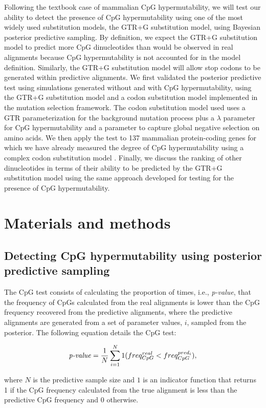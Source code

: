 \documentclass{article}
\begin{document}
Following the textbook case of mammalian CpG hypermutability, we will test our ability to detect the presence of CpG hypermutability using one of the most widely used substitution models, the GTR+G substitution model, using Bayesian posterior predictive sampling.  By definition, we expect the GTR+G substitution model to predict more CpG dinucleotides than would be observed in real alignments because CpG hypermutability is not accounted for in the model definition.  Similarly, the GTR+G substitution model will allow stop codons to be generated within predictive alignments.  We first validated the posterior predictive test using simulations generated without and with CpG hypermutability, using the GTR+G substitution model and a codon substitution model implemented in the mutation selection framework.  The codon substitution model used uses a GTR parameterization for the background mutation process plus a $\lambda$ parameter for CpG hypermutability and a parameter to capture global negative selection on amino acids.  We then apply the test to 137 mammalian protein-coding genes for which we have already measured the degree of CpG hypermutability using a complex codon substitution model \citep{LaurinLemay2018b}. Finally, we discuss the ranking of other dinucleotides in terms of their ability to be predicted by the GTR+G substitution model using the same approach developed for testing for the presence of CpG hypermutability.

\section*{Materials and methods}
\subsection*{Detecting CpG hypermutability using posterior predictive sampling}
The CpG test consists of calculating the proportion of times, i.e., \emph{p-value}, that the frequency of CpGs calculated from the real alignments is lower than the CpG frequency recovered from the predictive alignments, where the predictive alignments are generated from a set of parameter values, $i$, sampled from the posterior.  The following equation details the CpG test:

\begin{equation}\label{test}
 \text{\emph{p-value}} = \frac{1}{N}\sum_{i=1}^{N}1(freq_{CpG}^{real}<freq_{CpG}^{pred_{i}}),
\end{equation}

where $N$ is the predictive sample size and $1$ is an indicator function that returns 1 if the CpG frequency calculated from the true alignment is less than the predictive CpG frequency and 0 otherwise.
\end{document}
